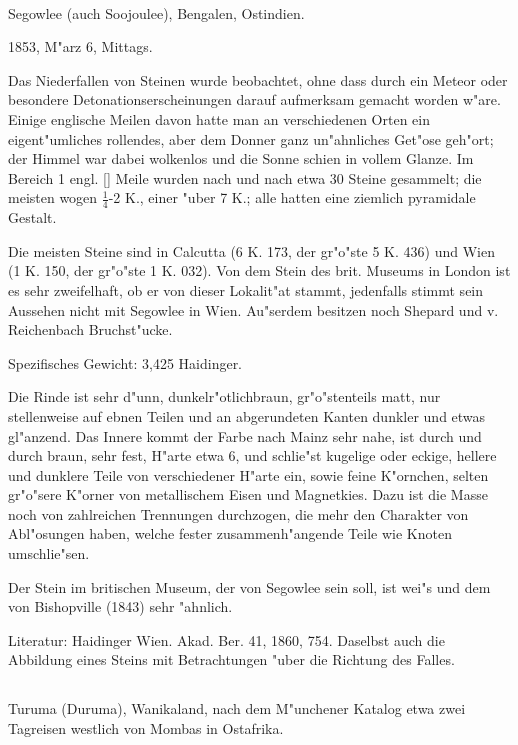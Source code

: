 \documentclass[a4paper, 11pt, oneside]{article}
\begin{document}
\paragraph{}
Segowlee (auch Soojoulee), Bengalen, Ostindien.

1853, M"arz 6, Mittags.

Das Niederfallen von Steinen wurde beobachtet, ohne dass durch ein Meteor oder besondere Detonationserscheinungen darauf aufmerksam gemacht worden w"are. Einige englische Meilen davon hatte man an verschiedenen Orten ein eigent"umliches rollendes, aber dem Donner ganz un"ahnliches Get"ose geh"ort; der Himmel war dabei wolkenlos und die Sonne schien in vollem Glanze. Im Bereich 1 engl. [] Meile wurden nach und nach etwa 30 Steine gesammelt; die meisten wogen $\mathfrak{\frac{1}{4}}$-2 K., einer "uber 7 K.; alle hatten eine ziemlich pyramidale Gestalt.

Die meisten Steine sind in Calcutta (6 K. 173, der gr"o"ste 5 K. 436) und Wien (1 K. 150, der gr"o"ste 1 K. 032). Von dem Stein des brit. Museums in London ist es sehr zweifelhaft, ob er von dieser Lokalit"at stammt, jedenfalls stimmt sein Aussehen nicht mit Segowlee in Wien. Au"serdem besitzen noch Shepard und v. Reichenbach Bruchst"ucke.

Spezifisches Gewicht: 3,425 Haidinger.

Die Rinde ist sehr d"unn, dunkelr"otlichbraun, gr"o"stenteils matt, nur stellenweise auf ebnen Teilen und an abgerundeten Kanten dunkler und etwas gl"anzend. Das Innere kommt der Farbe nach Mainz sehr nahe, ist durch und durch braun, sehr fest, H"arte etwa 6, und schlie"st kugelige oder eckige, hellere und dunklere Teile von verschiedener H"arte ein, sowie feine K"ornchen, selten gr"o"sere K"orner von metallischem Eisen und Magnetkies. Dazu ist die Masse noch von zahlreichen Trennungen durchzogen, die mehr den Charakter von Abl"osungen haben, welche fester zusammenh"angende Teile wie Knoten umschlie"sen.

Der Stein im britischen Museum, der von Segowlee sein soll, ist wei"s und dem von Bishopville (1843) sehr "ahnlich.

\normalsize
Literatur: Haidinger Wien. Akad. Ber. 41, 1860, 754. Daselbst auch die Abbildung eines Steins mit Betrachtungen "uber die Richtung des Falles.

\subsection{}
\LARGE
\paragraph{}
Turuma (Duruma), Wanikaland, nach dem M"unchener Katalog etwa zwei Tagreisen westlich von Mombas in Ostafrika.
\end{document}

